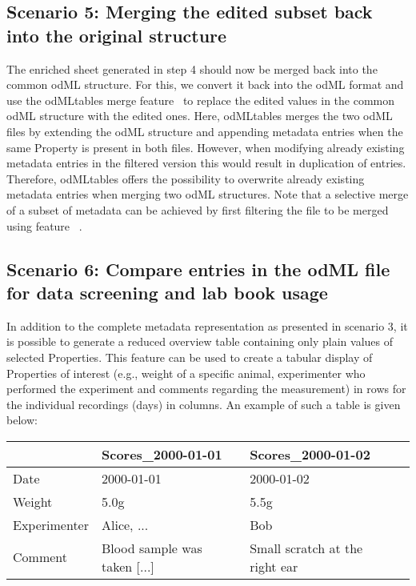 \subsection*{Scenario 5: Merging the edited subset back into the original structure}
The enriched  sheet generated in step 4 should now be merged back into the common odML structure. For this, we convert it back into the odML format and use the odMLtables merge feature \fmerge\ to replace the edited values in the common odML structure with the edited ones. Here, odMLtables merges the two odML files by extending the odML structure and appending metadata entries when the same Property is present in both files. However, when modifying already existing metadata entries in the filtered version this would result in duplication of entries. Therefore, odMLtables offers the possibility to overwrite already existing metadata entries when merging two odML structures. Note that a selective merge of a subset of metadata can be achieved by first filtering the file to be merged using feature \ffilter\ . 


\subsection*{Scenario 6: Compare entries in the odML file for data screening and lab book usage}
In addition to the complete metadata representation as presented in scenario 3, it is possible to generate a reduced overview table containing only plain values of selected Properties. This feature can be used to create a tabular display of Properties of interest (e.g., weight of a specific animal, experimenter who performed the experiment and comments regarding the measurement) in rows for the individual recordings (days) in columns. An example of such a table is given below:

\begin{center}
\begin{tabular}{|l||l|l|l|}
\hline
				 & Scores\_2000-01-01 & Scores\_2000-01-02\\
\hline
Date             &  2000-01-01 & 2000-01-02\\
\hline
Weight           &  5.0g & 5.5g\\
\hline
Experimenter     & Alice, ... & Bob\\
\hline
Comment  & Blood sample was taken [...] & Small scratch at the right ear \\
\hline
\end{tabular}
\end{center}

